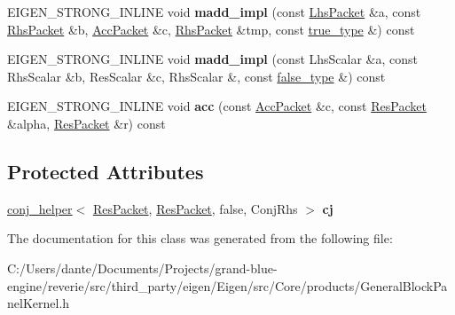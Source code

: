 \begin{DoxyCompactItemize}
E\+I\+G\+E\+N\+\_\+\+S\+T\+R\+O\+N\+G\+\_\+\+I\+N\+L\+I\+NE void {\bfseries madd\+\_\+impl} (const \mbox{\hyperlink{struct_eigen_1_1internal_1_1true__type}{Lhs\+Packet}} \&a, const \mbox{\hyperlink{struct_eigen_1_1internal_1_1true__type}{Rhs\+Packet}} \&b, \mbox{\hyperlink{struct_eigen_1_1internal_1_1true__type}{Acc\+Packet}} \&c, \mbox{\hyperlink{struct_eigen_1_1internal_1_1true__type}{Rhs\+Packet}} \&tmp, const \mbox{\hyperlink{struct_eigen_1_1internal_1_1true__type}{true\+\_\+type}} \&) const
\item 
\mbox{\label{class_eigen_1_1internal_1_1gebp__traits_3_01_real_scalar_00_01std_1_1complex_3_01_real_scalar_01f99740ceef5f07e0f3738974eb65d89c_a056952c4e2b8501f284340ccaaaef80d}} 
E\+I\+G\+E\+N\+\_\+\+S\+T\+R\+O\+N\+G\+\_\+\+I\+N\+L\+I\+NE void {\bfseries madd\+\_\+impl} (const Lhs\+Scalar \&a, const Rhs\+Scalar \&b, Res\+Scalar \&c, Rhs\+Scalar \&, const \mbox{\hyperlink{struct_eigen_1_1internal_1_1false__type}{false\+\_\+type}} \&) const
\item 
\mbox{\label{class_eigen_1_1internal_1_1gebp__traits_3_01_real_scalar_00_01std_1_1complex_3_01_real_scalar_01f99740ceef5f07e0f3738974eb65d89c_ac7066a8472bba3b2fa8a6d7851aa84d1}} 
E\+I\+G\+E\+N\+\_\+\+S\+T\+R\+O\+N\+G\+\_\+\+I\+N\+L\+I\+NE void {\bfseries acc} (const \mbox{\hyperlink{struct_eigen_1_1internal_1_1true__type}{Acc\+Packet}} \&c, const \mbox{\hyperlink{struct_eigen_1_1internal_1_1true__type}{Res\+Packet}} \&alpha, \mbox{\hyperlink{struct_eigen_1_1internal_1_1true__type}{Res\+Packet}} \&r) const
\end{DoxyCompactItemize}
\subsection*{Protected Attributes}
\begin{DoxyCompactItemize}
\item 
\mbox{\label{class_eigen_1_1internal_1_1gebp__traits_3_01_real_scalar_00_01std_1_1complex_3_01_real_scalar_01f99740ceef5f07e0f3738974eb65d89c_ab7ab949541407261496eac5410ce8cf8}} 
\mbox{\hyperlink{struct_eigen_1_1internal_1_1conj__helper}{conj\+\_\+helper}}$<$ \mbox{\hyperlink{struct_eigen_1_1internal_1_1true__type}{Res\+Packet}}, \mbox{\hyperlink{struct_eigen_1_1internal_1_1true__type}{Res\+Packet}}, false, Conj\+Rhs $>$ {\bfseries cj}
\end{DoxyCompactItemize}


The documentation for this class was generated from the following file\+:\begin{DoxyCompactItemize}
\item 
C\+:/\+Users/dante/\+Documents/\+Projects/grand-\/blue-\/engine/reverie/src/third\+\_\+party/eigen/\+Eigen/src/\+Core/products/General\+Block\+Panel\+Kernel.\+h\end{DoxyCompactItemize}
